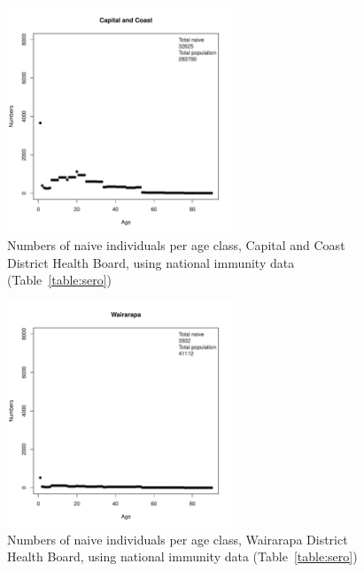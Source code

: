 \documentclass{article}
\begin{document}
\begin{figure}[H]
     \begin{center}
     \includegraphics[width=0.6\textwidth]{dhb14.pdf}
     \end{center}
     \caption{Numbers of naive individuals per age class, Capital and Coast District Health Board, using national immunity data (Table~\ref{table:sero})}
     \label{fig:CapitalandCoast}
\end{figure}

\begin{figure}[H]
     \begin{center}
     \includegraphics[width=0.6\textwidth]{dhb15.pdf}
     \end{center}
     \caption{Numbers of naive individuals per age class, Wairarapa District Health Board, using national immunity data (Table~\ref{table:sero})}
     \label{fig:Wairarapa}
\end{figure}
\end{document}
